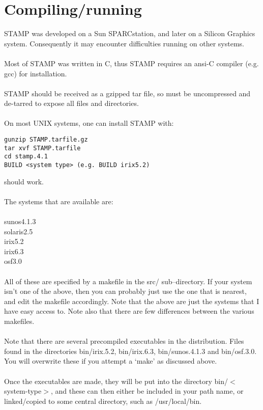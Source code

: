 \section{Compiling/running}

STAMP was developed on a Sun SPARCstation, and later on a Silicon Graphics
system.  Consequently it may encounter difficulties running on other systems.  \\
\\
Most of STAMP was written in C, thus STAMP requires an ansi-C 
compiler (e.g. gcc) for installation. \\
\\
STAMP should be received as a gzipped tar file, so must be 
uncompressed and de-tarred to expose all files and directories.\\
\\
On most UNIX systems, one can install STAMP with:\\

\begin{scriptsize}\begin{verbatim}
gunzip STAMP.tarfile.gz
tar xvf STAMP.tarfile
cd stamp.4.1
BUILD <system type> (e.g. BUILD irix5.2)
\end{verbatim} \end{scriptsize}

should work.\\
\\

The systems that are available are:\\
\\
sunos4.1.3\\
solaris2.5\\
irix5.2\\
irix6.3\\
osf3.0\\
\\
All of these are specified by a makefile in the src/ sub--directory.  If your system
isn't one of the above, then you can probably just use the one that is nearest, and edit
the makefile accordingly.  Note that the above are just the systems that I have easy access to. 
Note also that there are few differences between the various makefiles.\\
\\
Note that there are several precompiled executables in the distribution.  Files
found in the directories bin/irix.5.2, bin/irix.6.3, bin/sunos.4.1.3 and bin/osf.3.0.  You will
overwrite these if you attempt a `make' as discussed above.\\
\\
Once the executables are made, they 
will be put into the directory bin/$<$system-type$>$, and these can then either be
included in your path name, or linked/copied to some central 
directory, such as /usr/local/bin.

